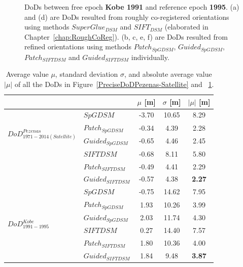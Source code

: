 \begin{figure}[htbp]
\begin{center}
		\caption{{\scriptsize \ac{DoD}s between free epoch \textbf{Kobe 1991} and reference epoch \textbf{1995}. (a) and (d) are \ac{DoD}s resulted from roughly co-registered orientations using methods $SuperGlue_{DSM}$ and $SIFT_{DSM}$ (elaborated in Chapter~\ref{chap:RoughCoReg}). (b, c, e, f) are \ac{DoD}s resulted from refined orientations using methods $Patch_{SpGDSM}$, $Guided_{SpGDSM}$, $Patch_{SIFTDSM}$ and $Guided_{SIFTDSM}$ individually.}}
		\label{PreciseDoDKobe}
	\end{center}
\end{figure} 



\begin{table}%
	\footnotesize
	\centering
	\begin{tabular}{||l|l|c|c|c||}\hline
		& &$\mu$ [m]&$\sigma$ [m]&$|\mu|$ [m]\\\hline\hline
		\multirow{4}{*}{$DoD^{Pezenas}_{1971-2014(Satellite)}$}
		&${{SpGDSM}}$ & -3.70 & 10.65 & 8.29\\
		&${Patch_{SpGDSM}}$ & -0.34 & 4.39 & 2.28\\
		&${Guided_{SpGDSM}}$ & -0.65 & 4.46 & 2.45\\
		&${{SIFTDSM}}$ & -0.68 & 8.11 & 5.80\\
		&${Patch_{SIFTDSM}}$ & -0.49 & 4.41 & 2.29\\
		&${Guided_{SIFTDSM}}$ & -0.57 & 4.38 & \textbf{2.27}\\\hline
		
		\multirow{6}{*}{$DoD^{Kobe}_{1991-1995}$}
		&${{SpGDSM}}$ & -0.75 & 14.62 & 7.95\\
		&${Patch_{SpGDSM}}$ & 1.93 & 10.26 & 3.99\\
		&${Guided_{SpGDSM}}$ & 2.03 & 11.74 & 4.30\\
		&${{SIFTDSM}}$ & 0.27 & 14.40 & 7.57\\
		&${Patch_{SIFTDSM}}$ & 1.80 & 10.36 & 4.00\\
		&${Guided_{SIFTDSM}}$ & 1.84 & 9.48 & \textbf{3.87}\\\hline
				
	\end{tabular}
	\caption{Average value $\mu$, standard deviation $\sigma$, and absolute average value $|\mu|$ of all the \ac{DoD}s in Figure~\ref{PreciseDoDPezenas-Satellite} and ~\ref{PreciseDoDKobe}.}
	\label{PreciseDoDStatistic1}
\end{table}


